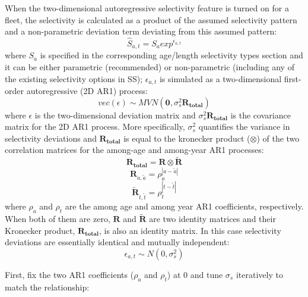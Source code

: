 \hypertarget{2DAR}{}
When the two-dimensional autoregressive selectivity feature is turned on for a fleet, the selectivity is calculated as a product of the assumed selectivity pattern and a non-parametric deviation term deviating from this assumed pattern:
	\begin{equation}
		\hat{S}_{a,t} = S_aexp^{\epsilon_{a,t}}
	\end{equation}
where $S_a$ is specified in the corresponding age/length selectivity types section and it can be either parametric (recommended) or non-parametric (including any of the existing selectivity options in SS); $\epsilon_{a,t}$ is simulated as a two-dimensional first-order autoregressive (2D AR1) process:
	\begin{equation}
		vec(\epsilon) \sim MVN(\mathbf{0},\sigma_s^2\mathbf{R_{total}})
	\end{equation}
where $\epsilon$ is the two-dimensional deviation matrix and $\sigma_s^2\mathbf{R_{total}}$ is the covariance matrix for the 2D AR1 process. More specifically, $\sigma_s^2$ quantifies the variance in selectivity deviations and $\mathbf{R_{total}}$ is equal to the kronecker product ($\otimes$) of the two correlation matrices for the among-age and among-year AR1 processes:
	\begin{equation}
		\mathbf{R_{total}}=\mathbf{R}\otimes\mathbf{\tilde{R}}
	\end{equation}
	\begin{equation}
	\mathbf{R}_{a,\tilde{a}}=\rho_a^{|a-\tilde{a}|}
	\end{equation}
	\begin{equation}
	\mathbf{\tilde{R}}_{t,\tilde{t}}=\rho_t^{|t-\tilde{t}|}
	\end{equation}
	where $\rho_a$ and $\rho_t$ are the among age and among year AR1 coefficients, respectively. When both of them are zero, $\mathbf{R}$ and $\mathbf{\tilde{R}}$ are two identity matrices and their Kronecker product, $\mathbf{R_{total}}$, is also an identity matrix. In this case selectivity deviations are essentially identical and mutually independent:
	\begin{equation}
		\epsilon_{a,t}\sim N(0,\sigma_s^2)
	\end{equation} 

First, fix the two AR1 coefficients ($\rho_a$ and $\rho_t$) at 0 and tune $\sigma_s$ iteratively to match the relationship:

